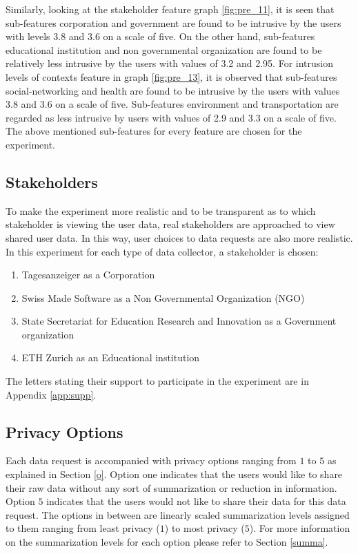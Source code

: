 Similarly, looking at the stakeholder feature graph \ref{fig:pre_11}, it is seen that sub-features  corporation and government are found to be intrusive by the users with levels 3.8 and 3.6 on a scale of five. On the other hand, sub-features educational institution and non governmental organization are found to be relatively less intrusive by the users with values of 3.2 and 2.95. For intrusion levels of contexts feature in graph \ref{fig:pre_13}, it is observed that sub-features social-networking and health are found to be intrusive by the users with values 3.8 and 3.6 on a scale of five. Sub-features environment and
transportation are regarded as less intrusive by users with values of 2.9 and 3.3 on a scale of five. The above mentioned sub-features for every feature are chosen for the experiment.

\subsection{Stakeholders} \label{stk}

To make the experiment more realistic and to be transparent as to which stakeholder is viewing the user data, real stakeholders are approached to view shared user data. In this way, user choices to data requests are also more realistic. In this experiment for each type of data collector, a stakeholder is chosen:
\begin{enumerate}
    \item Tagesanzeiger as a Corporation
    \item Swiss Made Software as a Non Governmental Organization (NGO)
    \item State Secretariat for Education Research and Innovation as a Government organization 
    \item ETH Zurich as an Educational institution
\end{enumerate}

The letters stating their support to participate in the experiment are in Appendix \ref{app:supp}.

\subsection{Privacy Options} \label{options}

Each data request is accompanied with privacy options ranging from $1$ to $5$ as explained in Section \ref{o}. Option one indicates that the users would like to
share their raw data without any sort of summarization or reduction in information. Option $5$ indicates that the users would not like to share their data for this data request.
The options in between are linearly scaled summarization levels assigned to them ranging from least privacy ($1$) to most privacy ($5$). For more information on the summarization levels for each option please refer to Section \ref{summa}. 


